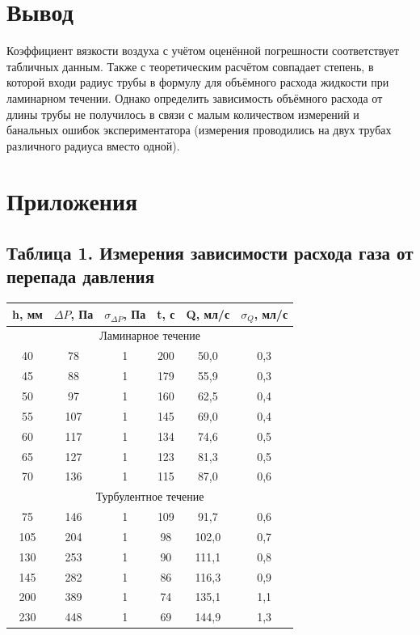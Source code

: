 \documentclass[15pt,a5paper,reqno]{article}
\begin{document}
\section{Вывод}
    
    Коэффициент вязкости воздуха с учётом оценённой погрешности соответствует табличных данным. Также с теоретическим расчётом совпадает степень, в которой входи радиус трубы в формулу для объёмного расхода жидкости при ламинарном течении. Однако определить зависимость объёмного расхода от длины трубы не получилось в связи с малым количеством измерений и банальных ошибок экспериментатора (измерения проводились на двух трубах различного радиуса вместо одной).

\newpage
\section{Приложения}

    \subsection{Таблица 1. Измерения зависимости расхода газа от перепада давления}
    \begin{tabular}{|c|c|c|c|c|c|}
        \hline
        h, мм & $\Delta P$, Па & $\sigma_{\Delta P}$, Па & t, с & Q, мл/с & $\sigma_{Q}$, мл/с \\ \hline
        \multicolumn{6}{|c|}{Ламинарное течение}    \\ \hline
        40 & 78  & 1 & 200 & 50,0 & 0,3             \\ \hline
        45 & 88  & 1 & 179 & 55,9 & 0,3             \\ \hline
        50 & 97  & 1 & 160 & 62,5 & 0,4             \\ \hline
        55 & 107 & 1 & 145 & 69,0 & 0,4             \\ \hline
        60 & 117 & 1 & 134 & 74,6 & 0,5             \\ \hline
        65 & 127 & 1 & 123 & 81,3 & 0,5             \\ \hline
        70 & 136 & 1 & 115 & 87,0 & 0,6             \\ \hline
        \multicolumn{6}{|c|}{Турбулентное течение}  \\ \hline
        75  & 146 & 1 & 109 & 91,7  & 0,6           \\ \hline
        105 & 204 & 1 & 98  & 102,0 & 0,7           \\ \hline
        130 & 253 & 1 & 90  & 111,1 & 0,8           \\ \hline
        145 & 282 & 1 & 86  & 116,3 & 0,9           \\ \hline
        200 & 389 & 1 & 74  & 135,1 & 1,1           \\ \hline
        230 & 448 & 1 & 69  & 144,9 & 1,3           \\ \hline
    \end{tabular}
    
\end{document}
